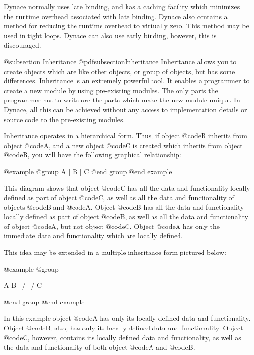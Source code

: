 Dynace normally uses late binding, and has a caching facility which minimizes
the runtime overhead associated with late binding.  Dynace also contains
a method for reducing the runtime overhead to virtually zero.  This
method may be used in tight loops.  Dynace can also use early binding,
however, this is discouraged.

@subsection Inheritance
@pdfsubsection{Inheritance}
Inheritance allows you to create objects which are like other objects,
or group of objects, but has some differences.  Inheritance is an
extremely powerful tool.  It enables a programmer to create a new
module by using pre-existing modules.  The only parts the programmer has
to write are the parts which make the new module unique.  In Dynace, all
this can be achieved without any access to implementation details or
source code to the pre-existing modules.

Inheritance operates in a hierarchical form.  Thus, if object @code{B}
inherits from object @code{A}, and a new object @code{C} is created
which inherits from object @code{B}, you will have the following
graphical relationship:


@example
@group
                       A
                       |
                       B
                       |
                       C
@end group
@end example

This diagram shows that object @code{C} has all the data and
functionality locally defined as part of object @code{C}, as well as all
the data and functionality of objects @code{B} and @code{A}.  Object
@code{B} has all the data and functionality locally defined as part of
object @code{B}, as well as all the data and functionality of object
@code{A}, but not object @code{C}.  Object @code{A} has only the
immediate data and functionality which are locally defined.

This idea may be extended in a multiple inheritance form pictured below:

@example
@group

               A     B
                \   /
                 \ /
                  C

@end group
@end example

In this example object @code{A} has only its locally defined data and
functionality.  Object @code{B}, also, has only its locally defined
data and functionality.  Object @code{C}, however, contains its locally
defined data and functionality, as well as the data and functionality of both
object @code{A} and @code{B}.

